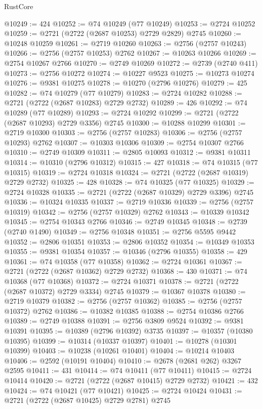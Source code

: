 \begin{lexlean}{RustCore}
\begin{coremodule}
@10249 := 424
@10252 := @74 @10249 (@77 @10249)
@10253 := @2724 @10252
@10259 := @2721 (@2722 (@2687 @10253) @2729 @2829) @2745
@10260 := @10248 @10259
@10261 := @2719 @10260
@10263 := @2756 (@2757 @10243)
@10266 := @2756 (@2757 @10253) @2762
@10267 := @10263 @10266
@10269 := @2754 @10267 @2766
@10270 := @2749 @10269
@10272 := @2739 (@2740 @411)
@10273 := @2756 @10272
@10274 := @10227 @9523
@10275 := @10273 @10274
@10276 := @9381 @10275
@10278 := @10270 (@2796 @10276)
@10279 := 425
@10282 := @74 @10279 (@77 @10279)
@10283 := @2724 @10282
@10288 := @2721 (@2722 (@2687 @10283) @2729 @2732)
@10289 := 426
@10292 := @74 @10289 (@77 @10289)
@10293 := @2724 @10292
@10299 := @2721 (@2722 (@2687 @10293) @2729 @3356) @2745
@10300 := @10288 @10299
@10301 := @2719 @10300
@10303 := @2756 (@2757 @10283)
@10306 := @2756 (@2757 @10293) @2762
@10307 := @10303 @10306
@10309 := @2754 @10307 @2766
@10310 := @2749 @10309
@10311 := @2805 @10093
@10312 := @9381 @10311
@10314 := @10310 (@2796 @10312)
@10315 := 427
@10318 := @74 @10315 (@77 @10315)
@10319 := @2724 @10318
@10324 := @2721 (@2722 (@2687 @10319) @2729 @2732)
@10325 := 428
@10328 := @74 @10325 (@77 @10325)
@10329 := @2724 @10328
@10335 := @2721 (@2722 (@2687 @10329) @2729 @3396) @2745
@10336 := @10324 @10335
@10337 := @2719 @10336
@10339 := @2756 (@2757 @10319)
@10342 := @2756 (@2757 @10329) @2762
@10343 := @10339 @10342
@10345 := @2754 @10343 @2766
@10346 := @2749 @10345
@10348 := @2739 (@2740 @1490)
@10349 := @2756 @10348
@10351 := @2756 @5595 @9442
@10352 := @2806 @10351
@10353 := @2806 @10352
@10354 := @10349 @10353
@10355 := @9381 @10354
@10357 := @10346 (@2796 @10355)
@10358 := 429
@10361 := @74 @10358 (@77 @10358)
@10362 := @2724 @10361
@10367 := @2721 (@2722 (@2687 @10362) @2729 @2732)
@10368 := 430
@10371 := @74 @10368 (@77 @10368)
@10372 := @2724 @10371
@10378 := @2721 (@2722 (@2687 @10372) @2729 @3334) @2745
@10379 := @10367 @10378
@10380 := @2719 @10379
@10382 := @2756 (@2757 @10362)
@10385 := @2756 (@2757 @10372) @2762
@10386 := @10382 @10385
@10388 := @2754 @10386 @2766
@10389 := @2749 @10388
@10391 := @2756 @3809 @9524
@10392 := @9381 @10391
@10395 := @10389 (@2796 @10392) @3735
@10397 := @10357 (@10380 @10395)
@10399 := @10314 (@10337 @10397)
@10401 := @10278 (@10301 @10399)
@10403 := @10238 (@10261 @10401)
@10404 := @10214 @10403
@10406 := @2592 (@10191 @10404)
@10410 := @2678 (@2681 @262) @3267 @2595
@10411 := 431
@10414 := @74 @10411 (@77 @10411)
@10415 := @2724 @10414
@10420 := @2721 (@2722 (@2687 @10415) @2729 @2732)
@10421 := 432
@10424 := @74 @10421 (@77 @10421)
@10425 := @2724 @10424
@10431 := @2721 (@2722 (@2687 @10425) @2729 @2781) @2745

\end{coremodule}
\end{lexlean}
